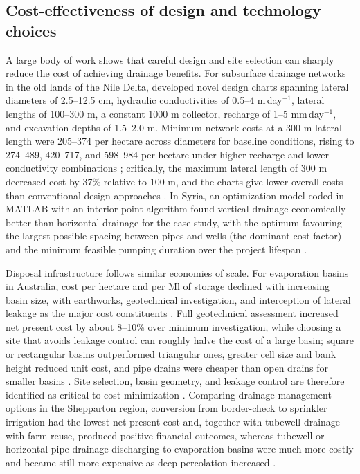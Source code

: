 \subsection{Cost-effectiveness of design and technology choices}
A large body of work shows that careful design and site selection can sharply reduce the cost of achieving drainage benefits. For subsurface drainage networks in the old lands of the Nile Delta, \textcite{Gabr2024} developed novel design charts spanning lateral diameters of 2.5--12.5 cm, hydraulic conductivities of 0.5--4 m\,day$^{-1}$, lateral lengths of 100--300 m, a constant 1000 m collector, recharge of 1--5 mm\,day$^{-1}$, and excavation depths of 1.5--2.0 m. Minimum network costs at a 300 m lateral length were 205--374 per hectare across diameters for baseline conditions, rising to 274--489, 420--717, and 598--984 per hectare under higher recharge and lower conductivity combinations \parencite{Gabr2024}; critically, the maximum lateral length of 300 m decreased cost by 37\% relative to 100 m, and the charts give lower overall costs than conventional design approaches \parencite{Gabr2024}. In Syria, an optimization model coded in MATLAB with an interior-point algorithm found vertical drainage economically better than horizontal drainage for the case study, with the optimum favouring the largest possible spacing between pipes and wells (the dominant cost factor) and the minimum feasible pumping duration over the project lifespan \parencite{Bakour2021}.

Disposal infrastructure follows similar economies of scale. For evaporation basins in Australia, cost per hectare and per Ml of storage declined with increasing basin size, with earthworks, geotechnical investigation, and interception of lateral leakage as the major cost constituents \parencite{Singh2001}. Full geotechnical assessment increased net present cost by about 8--10\% over minimum investigation, while choosing a site that avoids leakage control can roughly halve the cost of a large basin; square or rectangular basins outperformed triangular ones, greater cell size and bank height reduced unit cost, and pipe drains were cheaper than open drains for smaller basins \parencite{Singh2001}. Site selection, basin geometry, and leakage control are therefore identified as critical to cost minimization \parencite{Singh2001}. Comparing drainage-management options in the Shepparton region, conversion from border-check to sprinkler irrigation had the lowest net present cost and, together with tubewell drainage with farm reuse, produced positive financial outcomes, whereas tubewell or horizontal pipe drainage discharging to evaporation basins were much more costly and became still more expensive as deep percolation increased \parencite{Bethune2008}.

